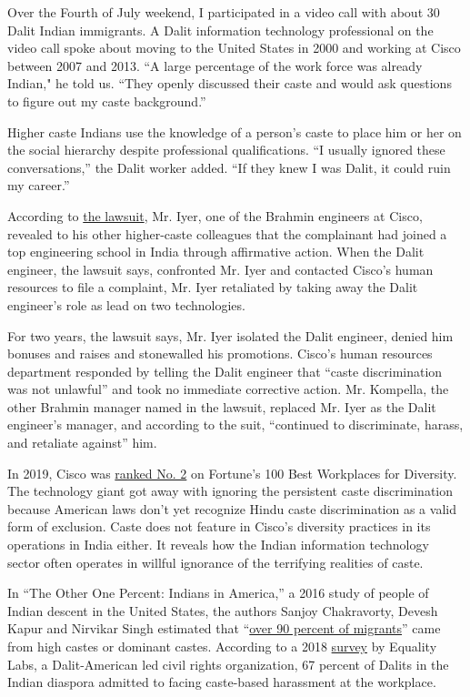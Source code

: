 Over the Fourth of July weekend, I participated in a video call with
about 30 Dalit Indian immigrants. A Dalit information technology
professional on the video call spoke about moving to the United States
in 2000 and working at Cisco between 2007 and 2013. ``A large percentage
of the work force was already Indian," he told us. ``They openly
discussed their caste and would ask questions to figure out my caste
background.''

Higher caste Indians use the knowledge of a person's caste to place him
or her on the social hierarchy despite professional qualifications. ``I
usually ignored these conversations,'' the Dalit worker added. ``If they
knew I was Dalit, it could ruin my career.''

According to \href{https://regmedia.co.uk/2020/07/01/cisco.pdf}{the
lawsuit}, Mr. Iyer, one of the Brahmin engineers at Cisco, revealed to
his other higher-caste colleagues that the complainant had joined a top
engineering school in India through affirmative action. When the Dalit
engineer, the lawsuit says, confronted Mr. Iyer and contacted Cisco's
human resources to file a complaint, Mr. Iyer retaliated by taking away
the Dalit engineer's role as lead on two technologies.

For two years, the lawsuit says, Mr. Iyer isolated the Dalit engineer,
denied him bonuses and raises and stonewalled his promotions. Cisco's
human resources department responded by telling the Dalit engineer that
``caste discrimination was not unlawful'' and took no immediate
corrective action. Mr. Kompella, the other Brahmin manager named in the
lawsuit, replaced Mr. Iyer as the Dalit engineer's manager, and
according to the suit, ``continued to discriminate, harass, and
retaliate against'' him.

In 2019, Cisco was
\href{https://blogs.cisco.com/diversity/diversity-award}{ranked No. 2}
on Fortune's 100 Best Workplaces for Diversity. The technology giant got
away with ignoring the persistent caste discrimination because American
laws don't yet recognize Hindu caste discrimination as a valid form of
exclusion. Caste does not feature in Cisco's diversity practices in its
operations in India either. It reveals how the Indian information
technology sector often operates in willful ignorance of the terrifying
realities of caste.

In ``The Other One Percent: Indians in America,'' a 2016 study of people
of Indian descent in the United States, the authors Sanjoy Chakravorty,
Devesh Kapur and Nirvikar Singh estimated that
``\href{https://indianexpress.com/article/lifestyle/books/the-other-one-percent-indians-in-america-book-review-migration-4419534/}{over
90 percent of migrants}'' came from high castes or dominant castes.
According to a 2018
\href{https://static1.squarespace.com/static/58347d04bebafbb1e66df84c/t/5d9b4f9afbaef569c0a5c132/1570459664518/Caste_report_2018.pdf}{survey}
by Equality Labs, a Dalit-American led civil rights organization, 67
percent of Dalits in the Indian diaspora admitted to facing caste-based
harassment at the workplace.

